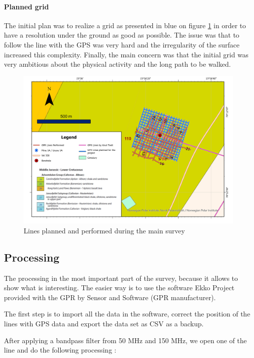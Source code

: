 \paragraph{Planned grid}

The initial plan was to realize a grid as presented in blue on figure \ref{fig:GPRLines} in order to have a resolution under the ground as good as possible. The issue was that to follow the line with the GPS was very hard and the irregularity of the surface increased this complexity. Finally, the main concern was that the initial grid was very ambitious about the physical activity and the long path to be walked.

\begin{figure}[H]
    \centering
    \includegraphics[width=\linewidth]{Images/00_Methodology/GPR LIne.jpg}
    \caption{Lines planned and performed during the main survey}
    \label{fig:GPRLines}
\end{figure}

\subsection{Processing}

The processing in the most important part of the survey, because it allows to show what is interesting. The easier way is to use the software Ekko Project provided with the GPR by Sensor and Software (GPR manufacturer).

The first step is to import all the data in the software, correct the position of the lines with GPS data and export the data set as CSV as a backup.

After applying a bandpass filter from 50 MHz and 150 MHz, we open one of the line and do the following processing :

